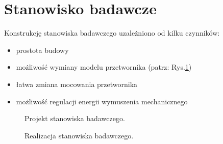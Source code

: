 \section{Stanowisko badawcze}
\label{sec:test_stand}

Konstrukcję stanowiska badawczego uzależniono od kilku czynników:
\begin{itemize}
\item prostota budowy
\item możliwość wymiany modelu przetwornika (patrz: Rys.\ref{fig:test_stand})
\item łatwa zmiana mocowania przetwornika
\item możliwość regulacji energii wymuszenia mechanicznego
\end{itemize}

\begin{figure}[htbp]
\centering
{}%
\caption{Projekt stanowiska badawczego.}
\label{fig:test_stand}
\end{figure}

\begin{figure}[htbp]
\centering
{}%
\caption{Realizacja stanowiska badawczego.}
\label{fig:test_stand_photo}
\end{figure}